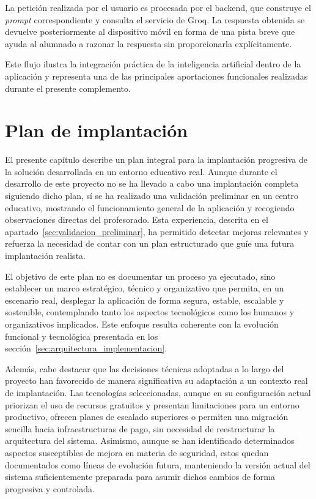 La petición realizada por el usuario es procesada por el backend, que construye el \textit{prompt} correspondiente y consulta el servicio de Groq. La respuesta obtenida se devuelve posteriormente al dispositivo móvil en forma de una pista breve que ayuda al alumnado a razonar la respuesta sin proporcionarla explícitamente.

Este flujo ilustra la integración práctica de la inteligencia artificial dentro de la aplicación y representa una de las principales aportaciones funcionales realizadas durante el presente complemento.

\chapter{Plan de implantación}
\label{chap:implantacion}

El presente capítulo describe un plan integral para la implantación progresiva de la solución desarrollada en un entorno educativo real. Aunque durante el desarrollo de este proyecto no se ha llevado a cabo una implantación completa siguiendo dicho plan, sí se ha realizado una validación preliminar en un centro educativo, mostrando el funcionamiento general de la aplicación y recogiendo observaciones directas del profesorado. Esta experiencia, descrita en el apartado~\ref{sec:validacion_preliminar}, ha permitido detectar mejoras relevantes y refuerza la necesidad de contar con un plan estructurado que guíe una futura implantación realista.

El objetivo de este plan no es documentar un proceso ya ejecutado, sino establecer un marco estratégico, técnico y organizativo que permita, en un escenario real, desplegar la aplicación de forma segura, estable, escalable y sostenible, contemplando tanto los aspectos tecnológicos como los humanos y organizativos implicados. Este enfoque resulta coherente con la evolución funcional y tecnológica presentada en los sección~\ref{sec:arquitectura_implementacion}.

Además, cabe destacar que las decisiones técnicas adoptadas a lo largo del proyecto han favorecido de manera significativa su adaptación a un contexto real de implantación. Las tecnologías seleccionadas, aunque en su configuración actual priorizan el uso de recursos gratuitos y presentan limitaciones para un entorno productivo, ofrecen planes de escalado superiores o permiten una migración sencilla hacia infraestructuras de pago, sin necesidad de reestructurar la arquitectura del sistema. Asimismo, aunque se han identificado determinados aspectos susceptibles de mejora en materia de seguridad, estos quedan documentados como líneas de evolución futura, manteniendo la versión actual del sistema suficientemente preparada para asumir dichos cambios de forma progresiva y controlada.
